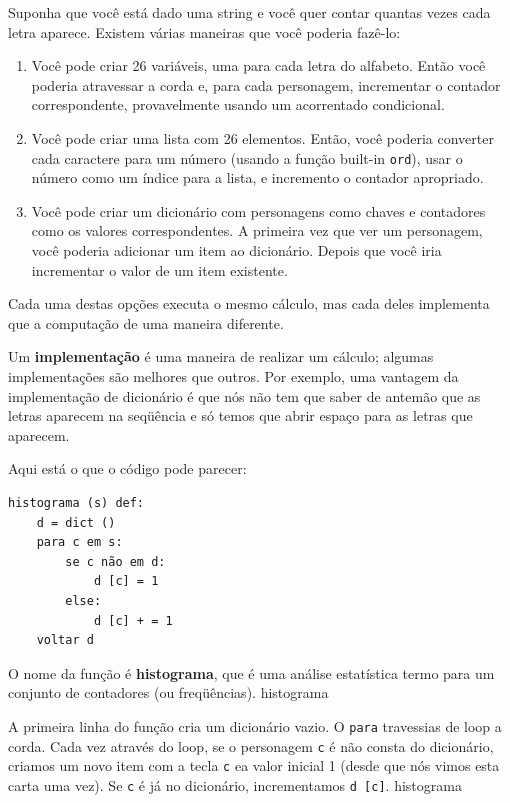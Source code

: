 \documentclass[10pt]{book}
\begin{document}
Suponha que você está dado uma string e você quer contar quantas
vezes cada letra aparece. Existem várias maneiras que você poderia fazê-lo:

\begin{enumerate}

\item Você pode criar 26 variáveis, uma para cada letra do
alfabeto. Então você poderia atravessar a corda e, para cada
personagem, incrementar o contador correspondente, provavelmente usando
um acorrentado condicional.

\item Você pode criar uma lista com 26 elementos. Então, você poderia
converter cada caractere para um número (usando a função built-in
{\tt ord}), usar o número como um índice para a lista, e incremento
o contador apropriado.

\item Você pode criar um dicionário com personagens como chaves
e contadores como os valores correspondentes. A primeira vez que
ver um personagem, você poderia adicionar um item ao dicionário. Depois
que você iria incrementar o valor de um item existente.

\end{enumerate}

Cada uma destas opções executa o mesmo cálculo, mas cada
deles implementa que a computação de uma maneira diferente.

Um {\bf implementação} é uma maneira de realizar um cálculo;
algumas implementações são melhores que outros. Por exemplo,
uma vantagem da implementação de dicionário é que nós não
tem que saber de antemão que as letras aparecem na seqüência
e só temos que abrir espaço para as letras que aparecem.

Aqui está o que o código pode parecer:

\begin{verbatim}
histograma (s) def:
    d = dict ()
    para c em s:
        se c não em d:
            d [c] = 1
        else:
            d [c] + = 1
    voltar d
\end{verbatim}
%
O nome da função é {\bf histograma}, que é uma análise estatística
termo para um conjunto de contadores (ou freqüências).
\index{} histograma

A primeira linha do
função cria um dicionário vazio. O {\tt para} travessias de loop
a corda. Cada vez através do loop, se o personagem {\tt c} é
não consta do dicionário, criamos um novo item com a tecla {\tt c} ea
valor inicial 1 (desde que nós vimos esta carta uma vez). Se {\tt c} é
já no dicionário, incrementamos {\tt d [c]}.
\index{} histograma
\end{document}
